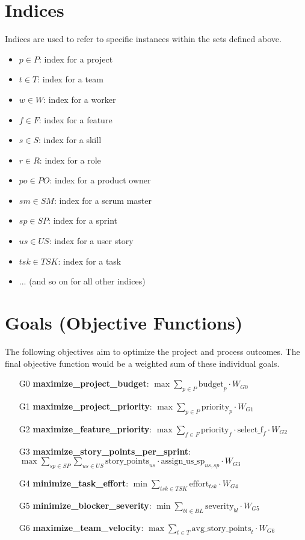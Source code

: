 \documentclass[11pt]{article}
\begin{document}
\section{Indices}
Indices are used to refer to specific instances within the sets defined above.
\begin{itemize}
    \item $p \in P$: index for a project
    \item $t \in T$: index for a team
    \item $w \in W$: index for a worker
    \item $f \in F$: index for a feature
    \item $s \in S$: index for a skill
    \item $r \in R$: index for a role
    \item $po \in PO$: index for a product owner
    \item $sm \in SM$: index for a scrum master
    \item $sp \in SP$: index for a sprint
    \item $us \in US$: index for a user story
    \item $tsk \in TSK$: index for a task
    \item ... (and so on for all other indices)
\end{itemize}

\section{Goals (Objective Functions)}
The following objectives aim to optimize the project and process outcomes. The final objective function would be a weighted sum of these individual goals.
\begin{itemize}
    \item[G0] \textbf{maximize\_project\_budget}: $ \max \sum_{p \in P} \text{budget}_p \cdot W_{G0} $
    \item[G1] \textbf{maximize\_project\_priority}: $ \max \sum_{p \in P} \text{priority}_p \cdot W_{G1} $
    \item[G2] \textbf{maximize\_feature\_priority}: $ \max \sum_{f \in F} \text{priority}_f \cdot \text{select\_f}_{f} \cdot W_{G2} $
    \item[G3] \textbf{maximize\_story\_points\_per\_sprint}: $ \max \sum_{sp \in SP} \sum_{us \in US} \text{story\_points}_{us} \cdot \text{assign\_us\_sp}_{us,sp} \cdot W_{G3} $
    \item[G4] \textbf{minimize\_task\_effort}: $ \min \sum_{tsk \in TSK} \text{effort}_{tsk} \cdot W_{G4} $
    \item[G5] \textbf{minimize\_blocker\_severity}: $ \min \sum_{bl \in BL} \text{severity}_{bl} \cdot W_{G5} $
    \item[G6] \textbf{maximize\_team\_velocity}: $ \max \sum_{t \in T} \text{avg\_story\_points}_{t} \cdot W_{G6} $
\end{itemize}
\end{document}
